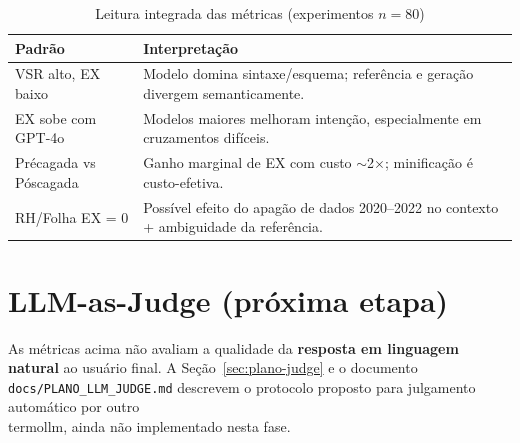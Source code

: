 \begin{table}[htbp]
\centering
\caption{Leitura integrada das métricas (experimentos $n=80$)}
\label{tab:leitura-metricas}
\begin{tabular}{|p{3.2cm}|p{9.5cm}|}
\hline
\textbf{Padrão} & \textbf{Interpretação} \\
\hline
VSR alto, EX baixo & Modelo domina sintaxe/esquema; referência e geração divergem semanticamente. \\
\hline
EX sobe com GPT-4o & Modelos maiores melhoram intenção, especialmente em cruzamentos difíceis. \\
\hline
Précagada vs Póscagada & Ganho marginal de EX com custo $\sim$2$\times$; minificação é custo-efetiva. \\
\hline
RH/Folha EX = 0 & Possível efeito do apagão de dados 2020--2022 no contexto + ambiguidade da referência. \\
\hline
\end{tabular}
\end{table}

\section{LLM-as-Judge (próxima etapa)}

As métricas acima não avaliam a qualidade da \textbf{resposta em linguagem natural} ao usuário final. A Seção~\ref{sec:plano-judge} e o documento \texttt{docs/PLANO\_LLM\_JUDGE.md} descrevem o protocolo proposto para julgamento automático por outro \\termo{llm}, ainda não implementado nesta fase.

